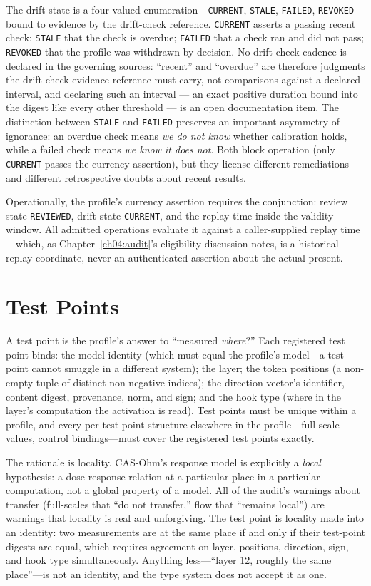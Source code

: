 The drift state is a four-valued enumeration---\texttt{CURRENT},
\texttt{STALE}, \texttt{FAILED}, \texttt{REVOKED}---bound to evidence by the
drift-check reference. \texttt{CURRENT} asserts a passing recent check;
\texttt{STALE} that the check is overdue; \texttt{FAILED} that a check ran
and did not pass; \texttt{REVOKED} that the profile was withdrawn by
decision. No drift-check cadence is declared in the governing sources:
``recent'' and ``overdue'' are therefore judgments the drift-check evidence
reference must carry, not comparisons against a declared interval, and
declaring such an interval --- an exact positive duration bound into the
digest like every other threshold --- is an open documentation item. The
distinction between \texttt{STALE} and \texttt{FAILED}
preserves an important asymmetry of ignorance: an overdue check means
\emph{we do not know} whether calibration holds, while a failed check means
\emph{we know it does not}. Both block operation (only \texttt{CURRENT}
passes the currency assertion), but they license different remediations and
different retrospective doubts about recent results.

Operationally, the profile's currency assertion requires the conjunction:
review state \texttt{REVIEWED}, drift state \texttt{CURRENT}, and the
replay time inside the validity window. All admitted operations evaluate it
against a caller-supplied replay time---which, as
Chapter~\ref{ch04:audit}'s eligibility discussion notes, is a historical
replay coordinate, never an authenticated assertion about the actual
present.

\section{Test Points}\label{ch05:testpoints}

A test point is the profile's answer to ``measured \emph{where}?'' Each
registered test point binds: the model identity (which must equal the
profile's model---a test point cannot smuggle in a different system); the
layer; the token positions (a non-empty tuple of distinct non-negative
indices); the direction vector's identifier, content digest, provenance,
norm, and sign; and the hook type (where in the layer's computation the
activation is read). Test points must be unique within a profile, and every
per-test-point structure elsewhere in the profile---full-scale values,
control bindings---must cover the registered test points exactly.

The rationale is locality. CAS-Ohm's response model is explicitly a
\emph{local} hypothesis: a dose-response relation at a particular place in a
particular computation, not a global property of a model. All of the audit's
warnings about transfer (full-scales that ``do not transfer,'' flow that
``remains local'') are warnings that locality is real and unforgiving. The
test point is locality made into an identity: two measurements are at the
same place if and only if their test-point digests are equal, which requires
agreement on layer, positions, direction, sign, and hook type
simultaneously. Anything less---``layer 12, roughly the same place''---is
not an identity, and the type system does not accept it as one.

